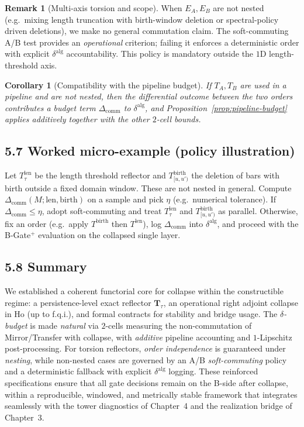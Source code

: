\documentclass[11pt]{article}
\DeclareRobustCommand{\hyp}{\nobreakdash-}
\numberwithin{equation}{section}
\newtheorem{corollary}[theorem]{Corollary}
\theoremstyle{definition}
\newtheorem{remark}[theorem]{Remark}
\begin{document}
\begin{remark}[Multi\hyp axis torsion and scope]
When $E_A,E_B$ are not nested (e.g.\ mixing length truncation with birth\hyp window deletion or spectral\hyp policy driven deletions), we make no general commutation claim. The soft\hyp commuting A/B test provides an \emph{operational} criterion; failing it enforces a deterministic order with explicit $\delta^{\mathrm{alg}}$ accountability. This policy is mandatory outside the $1$D length\hyp threshold axis.
\end{remark}

\begin{corollary}[Compatibility with the pipeline budget]
If $T_A,T_B$ are used in a pipeline and are not nested, then the differential outcome between the two orders contributes a budget term $\Delta_{\mathrm{comm}}$ to $\delta^{\mathrm{alg}}$, and Proposition~\ref{prop:pipeline-budget} applies additively together with the other $2$-cell bounds.
\end{corollary}

\subsection*{5.7 Worked micro\hyp example (policy illustration)}
Let $T^{\mathrm{len}}_\tau$ be the length threshold reflector and $T^{\mathrm{birth}}_{[u,u')}$ the deletion of bars with birth outside a fixed domain window. These are not nested in general. Compute $\Delta_{\mathrm{comm}}(M; \mathrm{len},\mathrm{birth})$ on a sample and pick $\eta$ (e.g.\ numerical tolerance). If $\Delta_{\mathrm{comm}}\le \eta$, adopt soft\hyp commuting and treat $T^{\mathrm{len}}_\tau$ and $T^{\mathrm{birth}}_{[u,u')}$ as parallel. Otherwise, fix an order (e.g.\ apply $T^{\mathrm{birth}}$ then $T^{\mathrm{len}}$), log $\Delta_{\mathrm{comm}}$ into $\delta^{\mathrm{alg}}$, and proceed with the B\hyp Gate$^+$ evaluation on the collapsed single layer.

\subsection*{5.8 Summary}
We established a coherent functorial core for collapse within the constructible regime: a persistence\hyp level exact reflector $\mathbf{T}_\tau$, an operational right adjoint collapse in $\mathrm{Ho}$ (up to f.q.i.), and formal contracts for stability and bridge usage. The \emph{$\delta$-budget} is made \emph{natural} via $2$-cells measuring the non\hyp commutation of Mirror/Transfer with collapse, with \emph{additive} pipeline accounting and $1$-Lipschitz post\hyp processing. For torsion reflectors, \emph{order independence} is guaranteed under \emph{nesting}, while non\hyp nested cases are governed by an A/B \emph{soft\hyp commuting} policy and a deterministic fallback with explicit $\delta^{\mathrm{alg}}$ logging. These reinforced specifications ensure that all gate decisions remain on the B\hyp side after collapse, within a reproducible, windowed, and metrically stable framework that integrates seamlessly with the tower diagnostics of Chapter~4 and the realization bridge of Chapter~3.
\end{document}
